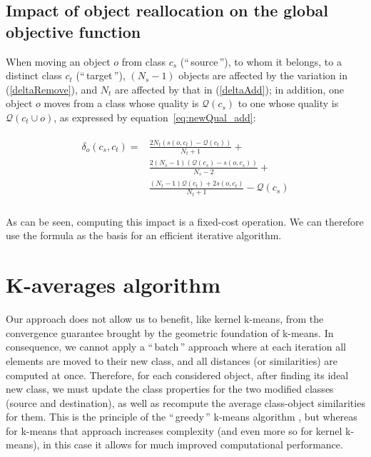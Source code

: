 \documentclass[natbib,smallextended]{svjour3}
\newcommand{\gl}[1]{``\,#1\,''} %
\begin{document}
\subsection{Impact of object reallocation on the global objective function}

When moving an object $o$ from class $c_s$ (\gl{source}), to whom it belongs, to a
distinct class $c_t$ (\gl{target}), $(N_s-1)$ objects are affected
by the variation in (\ref{deltaRemove}), and $N_t$ are affected
by that in (\ref{deltaAdd}); in addition, one object $o$ moves from a class whose quality is $\mathcal{Q}(c_s)$ to one whose quality is $\mathcal{Q}\left(c_t \cup o\right)$, as expressed by equation~\ref{eq:newQual_add}:

\begin{align}
\begin{split}
  \delta_o(c_s, c_t) = & \frac{2N_t \left(s\left(o, c_t\right)-\mathcal{Q}(c_t)\right)}{N_t+1} + \\
&  \frac{2(N_s-1)\left( \mathcal{Q}(c_s) - s\left(o, c_s\right)\right)}{N_s-2}  + \\
 &  \frac{(N_t-1) \mathcal{Q}(c_t)  + 2s\left(o, c_t\right)}{N_t+1} - \mathcal{Q}(c_s) \\
\end{split}
  \label{eq:impact_classnorm}
\end{align}

As can be seen, computing this impact is a fixed-cost operation. We can therefore use the formula as the basis for an efficient iterative algorithm.

\section{K-averages algorithm}
\label{sec:algo}

Our approach does not allow us to benefit, like kernel k-means, from the convergence guarantee brought by the geometric foundation of k-means. In consequence, we cannot apply a \gl{batch} approach where at each iteration all elements are moved to their new class, and all distances (or similarities) are computed at once. Therefore, for each considered object, after finding its ideal new class, we must update the class properties for the two modified classes (source and destination), as well as recompute the average class-object similarities for them. This is the principle of the \gl{greedy} k-means algorithm \citep[Chapter10.8]{Duda01}, but whereas for k-means that approach increases complexity (and even more so for kernel k-means), in this case it allows for much improved computational performance.
\end{document}
